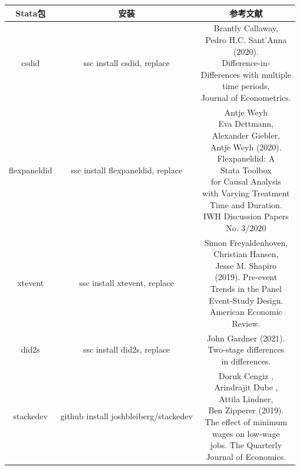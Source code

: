 \documentclass[cn,12pt,math=newtx,citestyle=gb7714-2015,bibstyle=gb7714-2015]{elegantbook}
\makeatletter
\newcommand{\tabincell}[2]{\begin{tabular}{@{}#1@{}}#2\end{tabular}}  %
\makeatother
\begin{document}
	
	\begin{table}[htbp]
		\centering
		\caption{交叠DID的Stata包及对应文献(续表)}
		\begin{longtable}{|c|c|c|}
			\hline
			Stata包&安装  & 参考文献 \\
			\hline
			
			csdid &	ssc install csdid, replace& \tabincell{c}{Brantly Callaway, \\Pedro H.C. Sant'Anna  \\(2020).\\ Difference-in-\\Differences with multiple \\time periods, \\Journal of Econometrics.}\\
			\hline
			flexpaneldid &	ssc install flexpaneldid, replace&\tabincell{c}{Antje Weyh\\	Eva Dettmann, \\Alexander Giebler,\\ Antje Weyh (2020).\\ Flexpaneldid: A \\Stata Toolbox \\for Causal Analysis \\with Varying Treatment \\Time and Duration. \\IWH Discussion Papers \\No. 3/2020} \\
			\hline
			
			xtevent	& ssc install xtevent, replace&\tabincell{c}{Simon Freyaldenhoven, \\Christian Hansen, \\Jesse M. Shapiro\\ (2019). Pre-event \\Trends in the Panel \\Event-Study Design.\\ American Economic\\ Review.}\\
			\hline
			did2s&	ssc install did2s, replace	& \tabincell{c}{John Gardner (2021). \\Two-stage differences \\in differences.}\\
			\hline
			stackedev &	github install joshbleiberg/stackedev&  \tabincell{c}{Doruk Cengiz , \\Arindrajit Dube , \\Attila Lindner,\\ Ben Zipperer  (2019). \\The effect of minimum \\wages on low-wage\\ jobs. The Quarterly \\Journal of Economics.} \\
			\hline
			

\end{longtable}
\end{table}
\end{document}
